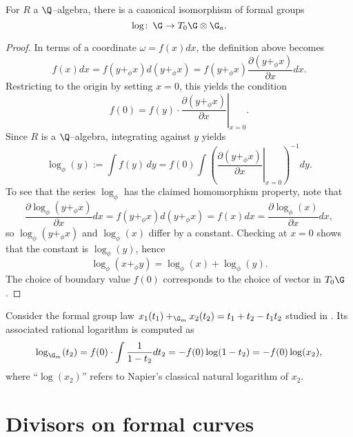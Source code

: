 \begin{theorem}\label{RationalFGLsHaveLogarithms}
For $R$ a $\Q$--algebra, there is a canonical isomorphism of formal groups \[\log\co \G \to T_0 \G \otimes \G_a.\]
\end{theorem}
\begin{proof}
In terms of a coordinate $\omega = f(x) dx$, the definition above becomes \[f(x) dx = f(y +_\phi x) d(y +_\phi x) = f(y +_\phi x) \frac{\partial(y +_\phi x)}{\partial x} dx.\]  Restricting to the origin by setting $x = 0$, this yields the condition \[f(0) = f(y) \cdot \left. \frac{\partial(y +_\phi x)}{\partial x} \right|_{x=0}.\]  Since $R$ is a $\Q$--algebra, integrating against $y$ yields \[\log_\phi(y) := \int f(y) \, dy = f(0) \int \left( \left. \frac{\partial(y +_\phi x)}{\partial x} \right|_{x=0} \right)^{-1} dy.\]  To see that the series $\log_\phi$ has the claimed homomorphism property, note that \[\frac{\partial \log_\phi(y +_\phi x)}{\partial x} dx = f(y +_\phi x) d(y +_\phi x) = f(x) dx = \frac{\partial \log_\phi(x)}{\partial x} dx,\] so $\log_\phi(y +_\phi x)$ and $\log_\phi(x)$ differ by a constant.  Checking at $x = 0$ shows that the constant is $\log_\phi(y)$, hence \[\log_\phi(x +_\phi y) = \log_\phi(x) + \log_\phi(y).\]  The choice of boundary value $f(0)$ corresponds to the choice of vector in $T_0 \G$.
\end{proof}

\begin{example}\label{GmAndItsLogExample}
Consider the formal group law $x_1(t_1) +_{\G_m} x_2(t_2) = t_1 + t_2 - t_1 t_2$ studied in .  Its associated rational logarithm is computed as \[\log_{\G_m}(t_2) = f(0) \cdot \int \frac{1}{1 - t_2} dt_2 = -f(0) \log(1 - t_2) = -f(0) \log(x_2),\] where ``$\log(x_2)$'' refers to Napier's classical natural logarithm of $x_2$.
\end{example}









\section{Divisors on formal curves}\label{CurveDivisorsSection}


